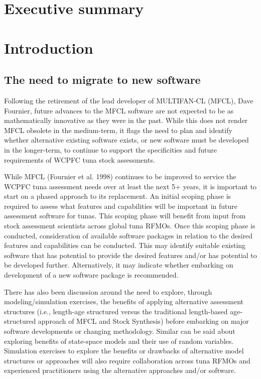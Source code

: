 \documentclass{SCreport}
\begin{document}
\wcpfctitlepage

\tableofcontents
\newpage

\section{Executive summary}

\section{Introduction}

\subsection{The need to migrate to new software}

Following the retirement of the lead developer of MULTIFAN-CL (MFCL), Dave
Fournier, future advances to the MFCL software are not expected to be as
mathematically innovative as they were in the past. While this does not render
MFCL obsolete in the medium-term, it flags the need to plan and identify whether
alternative existing software exists, or new software must be developed in the
longer-term, to continue to support the specificities and future requirements of
WCPFC tuna stock assessments.

While MFCL (Fournier et al. 1998) continues to be improved to service the WCPFC
tuna assessment needs over at least the next 5+ years, it is important to start
on a phased approach to its replacement. An initial scoping phase is required to
assess what features and capabilities will be important in future assessment
software for tunas. This scoping phase will benefit from input from stock
assessment scientists across global tuna RFMOs. Once this scoping phase is
conducted, consideration of available software packages in relation to the
desired features and capabilities can be conducted. This may identify suitable
existing software that has potential to provide the desired features and/or has
potential to be developed further. Alternatively, it may indicate whether
embarking on development of a new software package is recommended.

There has also been discussion around the need to explore, through
modeling/simulation exercises, the benefits of applying alternative assessment
structures (i.e., length-age structured versus the traditional length-based
age-structured approach of MFCL and Stock Synthesis) before embarking on major
software developments or changing methodology. Similar can be said about
exploring benefits of state-space models and their use of random variables.
Simulation exercises to explore the benefits or drawbacks of alternative model
structures or approaches will also require collaboration across tuna RFMOs and
experienced practitioners using the alternative approaches and/or software.
\end{document}
